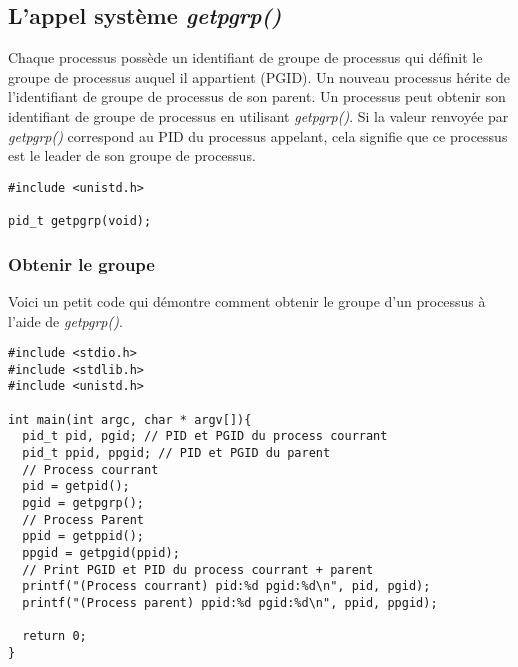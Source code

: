 \subsection{L’appel système \textit{getpgrp()} }
Chaque processus possède un identifiant de groupe de processus qui définit le groupe de processus auquel il appartient (PGID). Un nouveau processus hérite de l'identifiant de groupe de processus de son parent. Un processus peut obtenir son identifiant de groupe de processus en utilisant  \textit{getpgrp()}. Si la valeur renvoyée par  \textit{getpgrp()} correspond au PID du processus appelant, cela signifie que ce processus est le leader de son groupe de processus.
\newline
\begin{lstlisting}
#include <unistd.h>

pid_t getpgrp(void);
\end{lstlisting}

\subsubsection{Obtenir le groupe}

Voici un petit code qui démontre comment obtenir le groupe d'un processus à l'aide de  \textit{getpgrp()}.

\begin{lstlisting}[caption={obtenirGroupe.c}, label={obtenirGroupe.c}]
#include <stdio.h>
#include <stdlib.h>
#include <unistd.h>

int main(int argc, char * argv[]){
  pid_t pid, pgid; // PID et PGID du process courrant
  pid_t ppid, ppgid; // PID et PGID du parent
  // Process courrant
  pid = getpid();
  pgid = getpgrp();
  // Process Parent
  ppid = getppid();
  ppgid = getpgid(ppid);
  // Print PGID et PID du process courrant + parent
  printf("(Process courrant) pid:%d pgid:%d\n", pid, pgid);
  printf("(Process parent) ppid:%d pgid:%d\n", ppid, ppgid);

  return 0;
}
\end{lstlisting}

